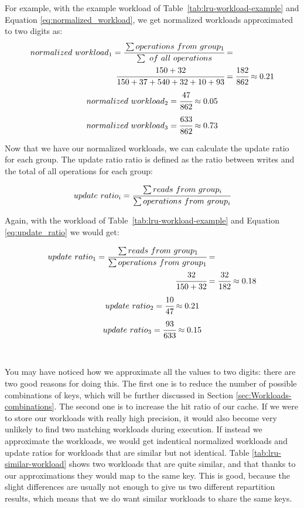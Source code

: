 For example, with the example workload of Table~\ref{tab:lru-workload-example} and Equation \ref{eq:normalized_workload}, we get normalized workloads approximated to two digits as: 
\begin{align*}
  normalized\ workload_1 = \cfrac{\sum operations\ from\ group_1}{\sum\ of\ all\ operations} &=\\ \cfrac{150+32}{150+37+540+32+10+93} &= \cfrac{182}{862} \approx 0.21
\end{align*}
\begin{equation*}
  normalized\ workload_2 = \cfrac{47}{862} \approx 0.05
\end{equation*}
\begin{equation*}
  normalized\ workload_3 = \cfrac{633}{862} \approx 0.73
\end{equation*}

Now that we have our normalized workloads, we can calculate the update ratio for each group. The update ratio ratio is defined as the ratio between writes and the total of all operations for each group:

\begin{equation} \label{eq:update_ratio}
  update\ ratio_i =  \cfrac{\sum reads\ from\ group_i}{\sum operations\ from\ group_i}
\end{equation}


Again, with the workload of Table~\ref{tab:lru-workload-example} and Equation \ref{eq:update_ratio} we would get:

\begin{align*}
  update\ ratio_1 =  \cfrac{\sum reads\ from\ group_1}{\sum operations\ from\ group_1} &=\\ \cfrac{32}{150+32} &= \cfrac{32}{182} \approx 0.18
\end{align*}
\begin{equation*}
  update\ ratio_2 = \cfrac{10}{47} \approx 0.21
\end{equation*}
\begin{equation*}
  update\ ratio_3 = \cfrac{93}{633} \approx 0.15
\end{equation*}
\\\\
You may have noticed how we approximate all the values to two digits: there are two good reasons for doing this. The first one is to reduce the number of possible combinations of keys, which will be further discussed in Section \ref{sec:Workloads-combinations}. The second one is to increase the hit ratio of our cache. If we were to store our workloads with really high precision, it would also become very unlikely to find two matching workloads during execution. If instead we approximate the workloads, we would get indentical normalized workloads and update ratios for workloads that are similar but not identical. Table \ref{tab:lru-similar-workload} shows two workloads that are quite similar, and that thanks to our approximations they would map to the same key. This is good, because the slight differences are usually not enough to give us two different repartition results, which means that we do want similar workloads to share the same keys.

